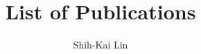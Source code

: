 \documentclass[12pt]{article}
\begin{document}
\cite{2013_1}
\cite{2013_2}
\cite{2012_1}
\cite{2012_2}
\cite{2011_1}
\cite{2011_2}
\cite{2010}
\cite{2009}
\cite{2008}
\cite{2007}
\cite{2005}
\newpage
\setcounter{page}{1}
\title{List of Publications}
\author{Shih-Kai Lin}
\date{}
\maketitle



\end{document}

